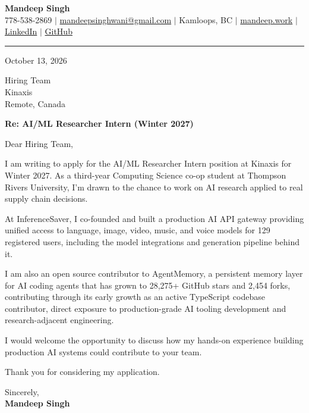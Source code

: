 \documentclass[letterpaper,11pt]{article}
\begin{document}
\begin{center}
    \textbf{\LARGE Mandeep Singh} \\ \vspace{2pt}
    \small 778-538-2869 $|$
    \href{mailto:mandeepsinghwani@gmail.com}{mandeepsinghwani@gmail.com} $|$
    Kamloops, BC $|$
    \href{https://mandeep.work}{mandeep.work} $|$
    \href{https://www.linkedin.com/in/mandeep-singh-b855972a7/}{LinkedIn} $|$
    \href{https://github.com/deepmroot}{GitHub}
\end{center}

\vspace{4pt}
\hrule
\vspace{14pt}

October 13, 2026

\vspace{8pt}
Hiring Team \\
Kinaxis \\
Remote, Canada

\vspace{8pt}
\textbf{Re: AI/ML Researcher Intern (Winter 2027)}

\vspace{10pt}
Dear Hiring Team,

\vspace{4pt}
I am writing to apply for the AI/ML Researcher Intern position at Kinaxis for Winter 2027. As a third-year Computing Science co-op student at Thompson Rivers University, I'm drawn to the chance to work on AI research applied to real supply chain decisions.

At InferenceSaver, I co-founded and built a production AI API gateway providing unified access to language, image, video, music, and voice models for 129 registered users, including the model integrations and generation pipeline behind it.

I am also an open source contributor to AgentMemory, a persistent memory layer for AI coding agents that has grown to 28,275+ GitHub stars and 2,454 forks, contributing through its early growth as an active TypeScript codebase contributor, direct exposure to production-grade AI tooling development and research-adjacent engineering.

I would welcome the opportunity to discuss how my hands-on experience building production AI systems could contribute to your team.

Thank you for considering my application.

\vspace{16pt}
Sincerely, \\
\vspace{6pt}
\textbf{Mandeep Singh}
\end{document}
